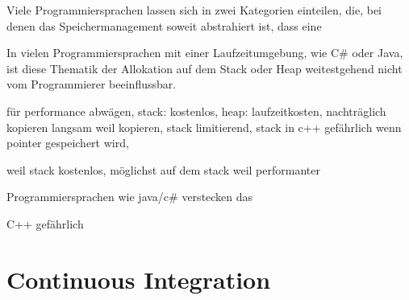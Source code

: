 Viele Programmiersprachen lassen sich in zwei Kategorien einteilen, die, bei denen das Speichermanagement soweit abstrahiert ist, dass eine 

In vielen Programmiersprachen mit einer Laufzeitumgebung, wie C\# oder Java, ist diese Thematik der Allokation auf dem Stack oder Heap weitestgehend nicht vom Programmierer beeinflussbar.



für performance abwägen,
stack: kostenlos,
heap: laufzeitkosten,
nachträglich kopieren langsam weil kopieren,
stack limitierend,
stack in c++ gefährlich wenn pointer gespeichert wird,

weil stack kostenlos, möglichst auf dem stack weil performanter

Programmiersprachen wie java/c\# verstecken das

C++ gefährlich

\section{Continuous Integration}

